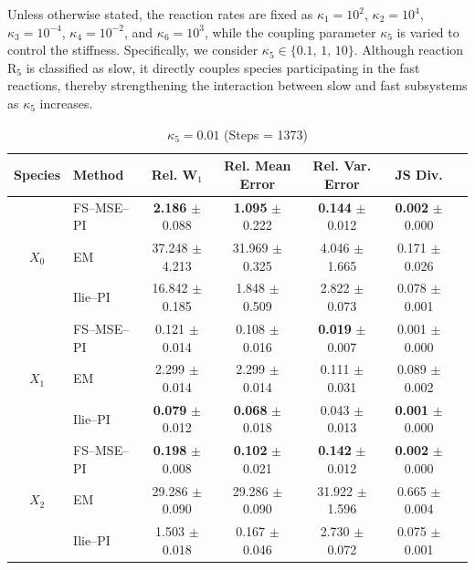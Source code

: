 \documentclass{article}
\begin{document}
Unless otherwise stated, the reaction rates are fixed as
$\kappa_1=10^2$, $\kappa_2=10^4$, $\kappa_3=10^{-4}$,
$\kappa_4=10^{-2}$, and $\kappa_6=10^3$,
while the coupling parameter $\kappa_5$ is varied to control the stiffness.
Specifically, we consider $\kappa_5\in\{0.1,\,1,\,10\}$.
Although reaction $\mathrm{R}_5$ is classified as slow, it directly couples
species participating in the fast reactions, thereby strengthening the interaction
between slow and fast subsystems as $\kappa_5$ increases.

\begin{table}[htpb]
\centering
\small
\caption{\small Distributional errors for different methods under varying stiffness parameter $\kappa_5$.
We measure distributional accuracy using the relative Wasserstein--1 distance
$\mathrm{Rel.\ }W_1=W_1(P,Q)/\mu_{\mathrm{ref}}$, where
$W_1(P,Q)=\int |F_P-F_Q|\,dx$ and
$\mu_{\mathrm{ref}}=\mathbb{E}[X^{\mathrm{ref}}(T)]$.
Moment accuracy is quantified by the relative mean error
$|\mathbb{E}[X^{\mathrm{meth}}(T)]-\mathbb{E}[X^{\mathrm{ref}}(T)]|/\mu_{\mathrm{ref}}$
and the relative variance error
$|\mathrm{Var}(X^{\mathrm{meth}}(T))-\mathrm{Var}(X^{\mathrm{ref}}(T))|
/\mathrm{Var}(X^{\mathrm{ref}}(T))$.
We further report the Jensen--Shannon divergence and the
Kullback--Leibler divergence computed from Gaussian kernel density estimates. All reported values are shown as mean $\pm$ 95\% confidence intervals,
computed from 10 independent repetitions, each based on $10{,}000$
sample paths.}
\label{tab:distribution_errors}
\renewcommand{\arraystretch}{1.15}
\begin{subtable}{\textwidth}
\centering
\caption{$\kappa_5 = 0.01$ (Steps = 1373)}
\begin{tabular}{clccccc}
\toprule
Species & Method & Rel. W$_1$ & Rel. Mean Error & Rel. Var. Error & JS Div. \\
\midrule
\multirow{3}{*}{$X_0$}
& FS–MSE–PI
& \textbf{2.186} $\pm$ 0.088
& \textbf{1.095} $\pm$ 0.222
& \textbf{0.144} $\pm$ 0.012
& \textbf{0.002} $\pm$ 0.000\\
& EM
& 37.248 $\pm$ 4.213
& 31.969 $\pm$ 0.325
& 4.046 $\pm$ 1.665
& 0.171 $\pm$ 0.026\\
& Ilie--PI
& 16.842 $\pm$ 0.185
& 1.848 $\pm$ 0.509
& 2.822 $\pm$ 0.073
& 0.078 $\pm$ 0.001\\
\midrule
\multirow{3}{*}{$X_1$}
& FS–MSE–PI
& 0.121 $\pm$ 0.014
& 0.108 $\pm$ 0.016
& \textbf{0.019} $\pm$ 0.007
& 0.001 $\pm$ 0.000\\
& EM
& 2.299 $\pm$ 0.014
& 2.299 $\pm$ 0.014
& 0.111 $\pm$ 0.031
& 0.089 $\pm$ 0.002\\
& Ilie--PI
& \textbf{0.079} $\pm$ 0.012
& \textbf{0.068} $\pm$ 0.018
& 0.043 $\pm$ 0.013
& \textbf{0.001} $\pm$ 0.000\\
\midrule
\multirow{3}{*}{$X_2$}
& FS–MSE–PI
& \textbf{0.198} $\pm$ 0.008
& \textbf{0.102} $\pm$ 0.021
& \textbf{0.142} $\pm$ 0.012
& \textbf{0.002} $\pm$ 0.000\\
& EM
& 29.286 $\pm$ 0.090
& 29.286 $\pm$ 0.090
& 31.922 $\pm$ 1.596
& 0.665 $\pm$ 0.004\\
& Ilie--PI
& 1.503 $\pm$ 0.018
& 0.167 $\pm$ 0.046
& 2.730 $\pm$ 0.072
& 0.075 $\pm$ 0.001\\


\end{tabular}
\end{subtable}
\end{table}
\end{document}
